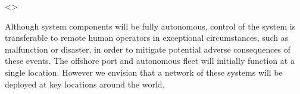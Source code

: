 <>

Although system components will be fully autonomous, control of the system is transferable to remote human operators in exceptional circumstances, such as malfunction or disaster, in order to mitigate potential adverse consequences of these events. The offshore port and autonomous fleet will initially function at a single location. However we envision that a network of these systems will be deployed at key locations around the world.